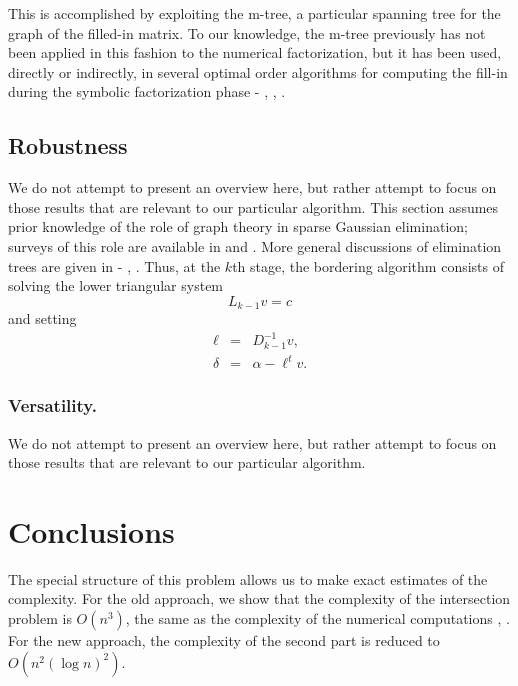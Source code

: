 This is accomplished by exploiting the m-tree,
a particular spanning tree for the graph of the filled-in matrix.
To our knowledge, the m-tree previously has not been applied in this
fashion to the numerical factorization, but it has been used,
directly or indirectly, in several optimal order algorithms for
computing the fill-in during the symbolic factorization phase
\cite{EISENSTAT} - \cite{LIU2}, \cite{ROSE76},  \cite{SCHREIBER}.

\subsection{Robustness} 
We do not
attempt to present an overview
here, but rather attempt to focus on those results that
are relevant to our particular algorithm.
This section assumes prior knowledge of the role of graph theory
in sparse Gaussian elimination; surveys of this role are
available in \cite{ROSE72} and \cite{GEORGELIU}. More general
discussions of elimination trees are given in
\cite{LAW} - \cite{LIU2}, \cite{SCHREIBER}.
Thus, at the $k$th stage, the bordering algorithm consists of
solving the lower triangular system
\begin{equation} \label{1.2}
 L_{k-1}v = c
\end{equation}
and setting
\begin{eqnarray} 
\ell &=& D^{-1}_{k-1}v , \\
\delta &=& \alpha - \ell^{t} v .
\end{eqnarray}

\subsubsection{Versatility.} We do not
attempt to present an overview
here, but rather attempt to focus on those results that
are relevant to our particular algorithm.
 
\section{Conclusions}  The special
structure of this problem allows us to make exact estimates of
the complexity.  For the old approach, we show that the
complexity of the intersection problem is $O(n^{3})$, the same
as the complexity of the numerical computations
\cite{GEORGELIU}, \cite{ROSEWHITTEN}.  For the
new approach, the complexity of the second part is reduced to
$O(n^{2} (\log n)^{2})$. 

